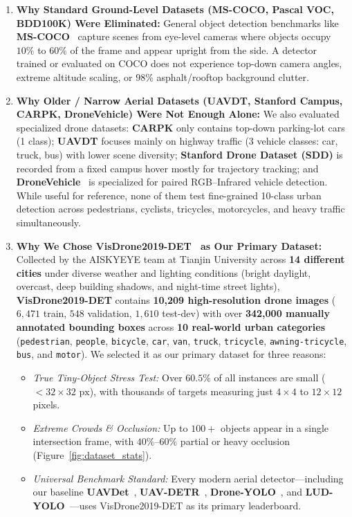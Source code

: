 \documentclass[11pt,a4paper]{article}
\begin{document}
\begin{enumerate}[leftmargin=1.6em]
    \item \textbf{Why Standard Ground-Level Datasets (MS-COCO, Pascal VOC, BDD100K) Were Eliminated:}
    General object detection benchmarks like \textbf{MS-COCO}~\cite{lin2017fpn} capture scenes from eye-level cameras where objects occupy $10\%$ to $60\%$ of the frame and appear upright from the side. A detector trained or evaluated on COCO does not experience top-down camera angles, extreme altitude scaling, or $98\%$ asphalt/rooftop background clutter.
    
    \item \textbf{Why Older / Narrow Aerial Datasets (UAVDT, Stanford Campus, CARPK, DroneVehicle) Were Not Enough Alone:}
    We also evaluated specialized drone datasets: \textbf{CARPK} only contains top-down parking-lot cars (1 class); \textbf{UAVDT} focuses mainly on highway traffic (3 vehicle classes: car, truck, bus) with lower scene diversity; \textbf{Stanford Drone Dataset (SDD)} is recorded from a fixed campus hover mostly for trajectory tracking; and \textbf{DroneVehicle}~\cite{sun2020drone} is specialized for paired RGB--Infrared vehicle detection. While useful for reference, none of them test fine-grained 10-class urban detection across pedestrians, cyclists, tricycles, motorcycles, and heavy traffic simultaneously.

    \item \textbf{Why We Chose VisDrone2019-DET~\cite{du2019visdrone,zhu2021visdrone} as Our Primary Dataset:}
    Collected by the AISKYEYE team at Tianjin University across \textbf{14 different cities} under diverse weather and lighting conditions (bright daylight, overcast, deep building shadows, and night-time street lights), \textbf{VisDrone2019-DET} contains \textbf{10,209 high-resolution drone images} ($6,471$ train, $548$ validation, $1,610$ test-dev) with over \textbf{342,000 manually annotated bounding boxes} across \textbf{10 real-world urban categories} (\texttt{pedestrian}, \texttt{people}, \texttt{bicycle}, \texttt{car}, \texttt{van}, \texttt{truck}, \texttt{tricycle}, \texttt{awning-tricycle}, \texttt{bus}, and \texttt{motor}). We selected it as our primary dataset for three reasons:
    \begin{itemize}[leftmargin=1.2em]
        \item \emph{True Tiny-Object Stress Test:} Over $60.5\%$ of all instances are small ($<32\times 32\text{ px}$), with thousands of targets measuring just $4\times 4$ to $12\times 12$ pixels.
        \item \emph{Extreme Crowds \& Occlusion:} Up to $100+$ objects appear in a single intersection frame, with $40\%$--$60\%$ partial or heavy occlusion (Figure~\ref{fig:dataset_stats}).
        \item \emph{Universal Benchmark Standard:} Every modern aerial detector---including our baseline \textbf{UAVDet}~\cite{yang2026uavdet}, \textbf{UAV-DETR}~\cite{zhang2025uavdetr}, \textbf{Drone-YOLO}~\cite{zhang2023droneyolo}, and \textbf{LUD-YOLO}~\cite{li2026ludyolo}---uses VisDrone2019-DET as its primary leaderboard.
    \end{itemize}


\end{enumerate}
\end{document}
